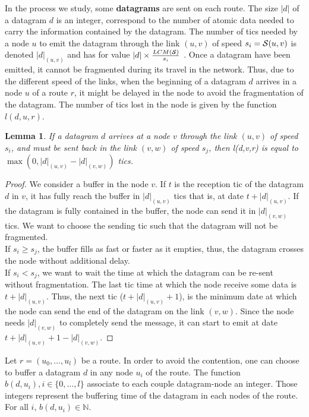 \documentclass[10pt]{article}
\newtheorem{lemma}[theorem]{Lemma}
\begin{document}
        In the process we study, some {\bf datagrams} are sent on each route. The size $|d|$ of a datagram $d$ is an integer, correspond to the number of atomic data needed to carry the information contained by the datagram. The number of tics needed by a node $u$ to emit the datagram through the link $(u,v)$ of speed $s_i = {\cal S}(u,v)$ is denoted $|d|_{(u,v)}$ and has for value $ |d| \times \frac{LCM({\cal S})}{s_i}$ . Once a datagram have been emitted, it cannot be fragmented during its travel in the network. Thus, due to the different speed of the links, when the beginning of a datagram $d$ arrives in a node $u$ of a route $r$, it might be delayed in the node to avoid the fragmentation of the datagram. The number of tics lost in the node is given by the function $l(d,u,r)$.\\
        \begin{lemma}
        If a datagram $d$ arrives at a node $v$ through the link $(u,v)$ of speed $s_i$, and must be sent back in the link $(v,w)$ of speed $s_j$, then l(d,v,r) is equal to $ \max( 0, |d|_{(u,v)} - |d|_{(v,w)} )$ tics.
        \end{lemma}
        \begin{proof}
        We consider a buffer in the node $v$. If $t$ is the reception tic of the datagram $d$ in $v$, it has fully reach the buffer in $|d|_{(u,v)}$ tics that is, at date $t+|d|_{(u,v)}$. If the datagram is fully contained in the buffer, the node can send it in $|d|_{(v,w)}$ tics. We want to choose the sending tic such that the datagram will not be fragmented.\\
        If $s_i \geq s_j$, the buffer fills as fast or faster as it empties, thus, the datagram crosses the node without additional delay.\\
   
        If $s_i < s_j$, we want to wait the time at which the datagram can be re-sent without fragmentation. The last tic time at which the node receive some data is $t+|d|_{(u,v)}$. Thus, the next tic ($t+|d|_{(u,v)}+1$), is the minimum date at which the node can send the end of the datagram on the link $(v,w)$. Since the node needs $|d|_{(v,w)}$ to completely send the message, it can start to emit at date $t+|d|_{(u,v)}+ 1 - |d|_{(v,w)}$. 
        \end{proof}
        
          Let $r=(u_0,\dots,u_l)$ be a route. In order to avoid the contention, one can choose to buffer a datagram $d$ in any node $u_i$ of the route. The function $b(d,u_i), i \in \{0,\ldots,l\}$ associate to each couple datagram-node an integer. Those integers represent the buffering time of the datagram in each nodes of the route. For all $i$, $b(d,u_i) \in \mathbb{N}$.
              
\end{document}
